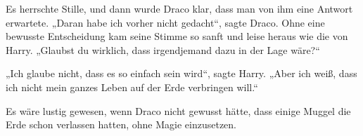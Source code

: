 Es herrschte Stille, und dann wurde Draco klar, dass man von ihm eine Antwort erwartete. „Daran habe ich vorher nicht gedacht“, sagte Draco. Ohne eine bewusste Entscheidung kam seine Stimme so sanft und leise heraus wie die von Harry. „Glaubst du wirklich, dass irgendjemand dazu in der Lage wäre?“

„Ich glaube nicht, dass es so einfach sein wird“, sagte Harry. „Aber ich weiß, dass ich nicht mein ganzes Leben auf der Erde verbringen will.“

Es wäre lustig gewesen, wenn Draco nicht gewusst hätte, dass einige Muggel die Erde schon verlassen hatten, ohne Magie einzusetzen.


